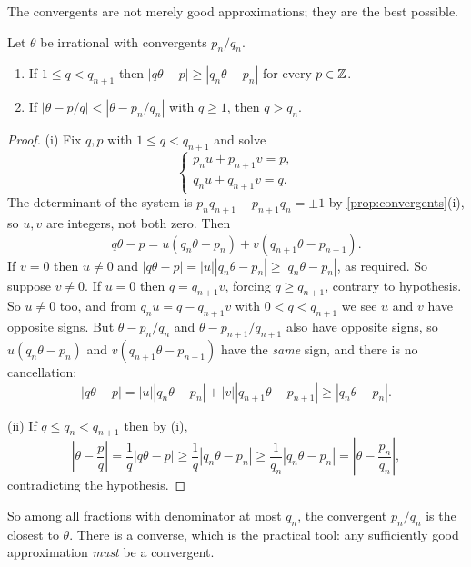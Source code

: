\documentclass[a4paper]{scrartcl}
\begin{document}
The convergents are not merely good approximations; they are the best possible.

\begin{theorem}\label{thm:bestapprox}
	Let $\theta$ be irrational with convergents $p_n/q_n$.
	\begin{enumerate}[label=(\roman*)]
		\item If $1 \leq q < q_{n+1}$ then $|q\theta - p| \geq |q_n\theta - p_n|$ for every $p \in \mathbb{Z}$.
		\item If $|\theta - p/q| < |\theta - p_n/q_n|$ with $q \geq 1$, then $q > q_n$.
	\end{enumerate}
\end{theorem}
\begin{proof}
	(i) Fix $q, p$ with $1 \leq q < q_{n+1}$ and solve
	$$
	\begin{cases} p_nu + p_{n+1}v = p, \\ q_nu+q_{n+1}v = q.\end{cases}
	$$
	The determinant of the system is $p_nq_{n+1} - p_{n+1}q_n = \pm1$ by \autoref{prop:convergents}(i), so $u, v$ are integers, not both zero. Then
	$$
	q\theta - p = u(q_n\theta - p_n) + v(q_{n+1}\theta - p_{n+1}).
	$$
	If $v = 0$ then $u \neq 0$ and $|q\theta - p| = |u||q_n\theta-p_n| \geq |q_n\theta - p_n|$, as required. So suppose $v \neq 0$. If $u = 0$ then $q = q_{n+1}v$, forcing $q \geq q_{n+1}$, contrary to hypothesis. So $u \neq 0$ too, and from $q_nu = q - q_{n+1}v$ with $0 < q < q_{n+1}$ we see $u$ and $v$ have opposite signs. But $\theta - p_n/q_n$ and $\theta - p_{n+1}/q_{n+1}$ also have opposite signs, so $u(q_n\theta - p_n)$ and $v(q_{n+1}\theta - p_{n+1})$ have the \emph{same} sign, and there is no cancellation:
	$$
	|q\theta - p| = |u||q_n\theta - p_n| + |v||q_{n+1}\theta - p_{n+1}| \geq |q_n\theta - p_n|.
	$$

	(ii) If $q \leq q_n < q_{n+1}$ then by (i),
	$$
	\left|\theta - \frac pq\right| = \frac1q|q\theta - p| \geq \frac1q|q_n\theta - p_n| \geq \frac1{q_n}|q_n\theta - p_n| = \left|\theta - \frac{p_n}{q_n}\right|,
	$$
	contradicting the hypothesis.
\end{proof}

So among all fractions with denominator at most $q_n$, the convergent $p_n/q_n$ is the closest to $\theta$. There is a converse, which is the practical tool: any sufficiently good approximation \emph{must} be a convergent.
\end{document}

